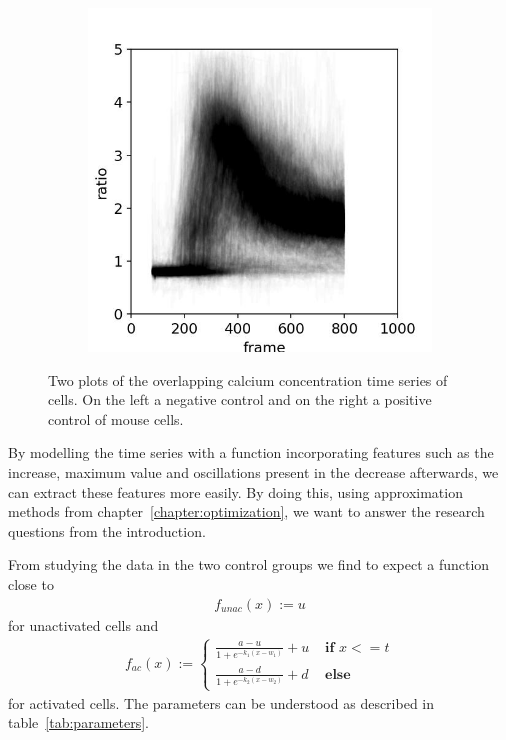 \begin{figure}
\begin{subfigure}{0.45\linewidth}
		\includegraphics[width=\textwidth]{fig/all_cells_overlayed_mouse_pos}
	\end{subfigure}
	
	\caption{Two plots of the overlapping calcium concentration time series of cells. On the left a negative control and on the right a positive control of mouse cells.}
	\label{fig:all_cells_overlayed}
\end{figure}

By modelling the time series with a function incorporating features such as the increase, maximum value and oscillations present in the decrease afterwards, we can extract these features more easily. By doing this, using approximation methods from chapter~\ref{chapter:optimization}, we want to answer the research questions from the introduction.

From studying the data in the two control groups we find to expect a function close to
\begin{align}
	\label{math:function_unactivated_cell}
	f_{unac}(x) := u
\end{align}
for unactivated cells and
\begin{align}
	\label{math:function_activated_cell}
	f_{ac}(x) := \begin{cases}
		\frac{a-u}{1 + e^{-k_1(x-w_1)}} + u & \textbf{ if } x <= t\\
		\frac{a-d}{1 + e^{-k_2(x-w_2)}} + d & \textbf{ else}
	\end{cases}
\end{align}
for activated cells. The parameters can be understood as described in table~\ref{tab:parameters}.


